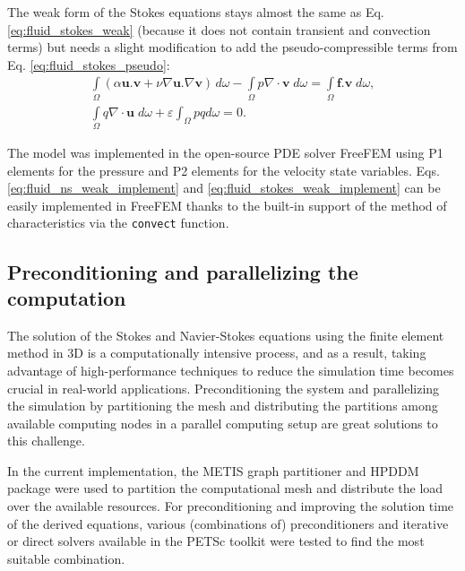 The weak form of the Stokes equations stays almost the same as Eq. \ref{eq:fluid_stokes_weak} (because it does not contain transient and convection terms) but needs a slight modification to add the pseudo-compressible terms from Eq. \ref{eq:fluid_stokes_pseudo}:
\begin{equation} \label{eq:fluid_stokes_weak_implement}
\begin{array}{*{20}{l}}
\displaystyle  {\int\limits_\Omega  {(\alpha {\mathbf{u}}.{\mathbf{v}} + \nu\nabla {\mathbf{u}}.\nabla {\mathbf{v}})\,} d\omega  - \int\limits_\Omega  {p\nabla\cdot{\mathbf{v}}\;d\omega  = } \int\limits_\Omega  {{\mathbf{f}}.{\mathbf{v}}\;d\omega,} } \\
\displaystyle  {\int\limits_\Omega  {q\nabla\cdot{\mathbf{u}}\;d\omega +\varepsilon \int_{\Omega} p q d \omega  = 0}.}
\end{array}
\end{equation}

The model was implemented in the open-source \gls{PDE} solver FreeFEM \cite{Hecht2012} using P1 elements for the pressure and P2 elements for the velocity state variables. Eqs. \ref{eq:fluid_ns_weak_implement} and \ref{eq:fluid_stokes_weak_implement} can be easily implemented in FreeFEM thanks to the built-in support of the method of characteristics via the \verb|convect| function.


\subsection{Preconditioning and parallelizing the computation}

The solution of the Stokes and Navier-Stokes equations using the finite element method in 3D is a computationally intensive process, and as a result, taking advantage of high-performance techniques to reduce the simulation time becomes crucial in real-world applications. Preconditioning the system and parallelizing the simulation by partitioning the mesh and distributing the partitions among available computing nodes in a parallel computing setup are great solutions to this challenge.

In the current implementation, the METIS graph partitioner \cite{METIS1998} and \gls{HPDDM} package \cite{Jolivet2013} were used to partition the computational mesh and distribute the load over the available resources. For preconditioning and improving the solution time of the derived equations, various (combinations of) preconditioners and iterative or direct solvers available in the \gls{PETSc} toolkit \cite{petsc} were tested to find the most suitable combination.


